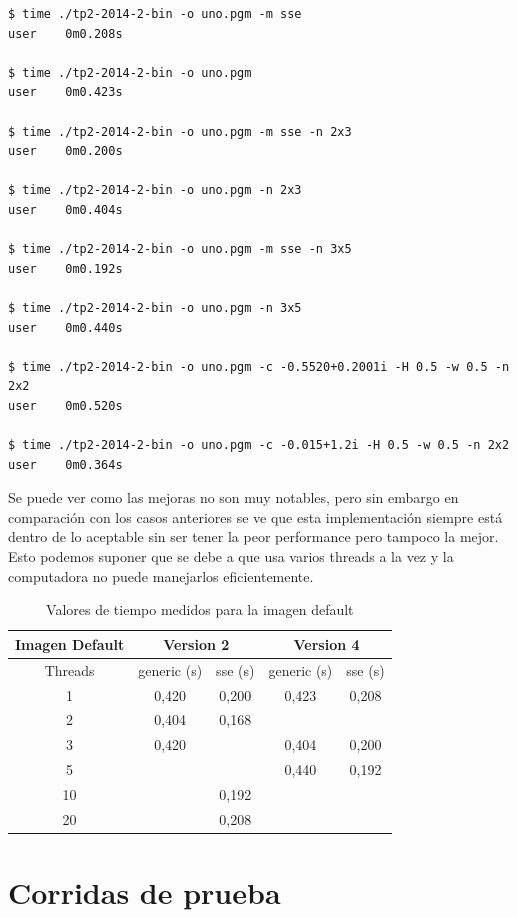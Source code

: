 \documentclass[a4paper,10pt]{article}
\begin{document}
\begin{verbatim}
$ time ./tp2-2014-2-bin -o uno.pgm -m sse
user	0m0.208s

$ time ./tp2-2014-2-bin -o uno.pgm
user	0m0.423s

$ time ./tp2-2014-2-bin -o uno.pgm -m sse -n 2x3
user	0m0.200s

$ time ./tp2-2014-2-bin -o uno.pgm -n 2x3
user	0m0.404s

$ time ./tp2-2014-2-bin -o uno.pgm -m sse -n 3x5
user	0m0.192s

$ time ./tp2-2014-2-bin -o uno.pgm -n 3x5 
user	0m0.440s

$ time ./tp2-2014-2-bin -o uno.pgm -c -0.5520+0.2001i -H 0.5 -w 0.5 -n 2x2
user	0m0.520s

$ time ./tp2-2014-2-bin -o uno.pgm -c -0.015+1.2i -H 0.5 -w 0.5 -n 2x2
user	0m0.364s

\end{verbatim}

Se puede ver como las mejoras no son muy notables, pero sin embargo en comparación con los casos anteriores se ve que esta implementación siempre está dentro de lo aceptable sin ser tener la peor performance pero tampoco la mejor. Esto podemos suponer que se debe a que usa varios threads a la vez y la computadora no puede manejarlos eficientemente.


\begin{table} [htbHp]
\begin{center}
\begin{tabular}{|c|c|c|c|c|}\hline
Imagen Default	&\multicolumn{2}{c|}{Version 2}&\multicolumn{2}{c|}{Version 4}\\\hline
Threads	&generic (s)	&sse (s)	&generic (s)	&sse (s)\\\hline
1	&0,420	&0,200		&0,423	&0,208		\\\hline
2	&0,404	&0,168		&	&		\\\hline
3	&0,420	&		&0,404	&0,200		\\\hline
5	&	&		&0,440	&0,192		\\\hline
10	&	&0,192		&	&		\\\hline
20	&	&0,208		&	&		\\\hline
\end{tabular}
\end{center}
\caption{Valores de tiempo medidos para la imagen default}
\end{table}





\section{Corridas de prueba}
\end{document}
